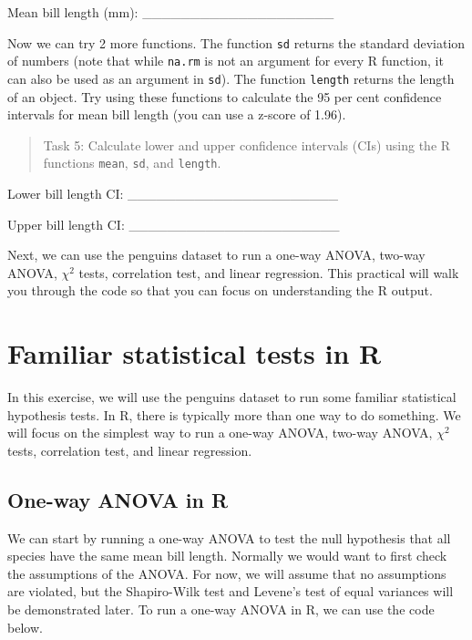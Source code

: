 \documentclass[
]{scrbook}
\begin{document}
Mean bill length (mm): \_\_\_\_\_\_\_\_\_\_\_\_\_\_\_\_\_\_\_\_

Now we can try 2 more functions.
The function \texttt{sd} returns the standard deviation of numbers (note that while \texttt{na.rm} is not an argument for every R function, it can also be used as an argument in \texttt{sd}).
The function \texttt{length} returns the length of an object.
Try using these functions to calculate the 95 per cent confidence intervals for mean bill length (you can use a z-score of 1.96).

\begin{quote}
Task 5: Calculate lower and upper confidence intervals (CIs) using the R functions \texttt{mean}, \texttt{sd}, and \texttt{length}.
\end{quote}

Lower bill length CI: \_\_\_\_\_\_\_\_\_\_\_\_\_\_\_\_\_\_\_\_\_\_

Upper bill length CI: \_\_\_\_\_\_\_\_\_\_\_\_\_\_\_\_\_\_\_\_\_\_

Next, we can use the penguins dataset to run a one-way ANOVA, two-way ANOVA, \(\chi^{2}\) tests, correlation test, and linear regression.
This practical will walk you through the code so that you can focus on understanding the R output.

\hypertarget{familiar-statistical-tests-in-r}{%
\section{Familiar statistical tests in R}\label{familiar-statistical-tests-in-r}}

In this exercise, we will use the penguins dataset to run some familiar statistical hypothesis tests.
In R, there is typically more than one way to do something.
We will focus on the simplest way to run a one-way ANOVA, two-way ANOVA, \(\chi^{2}\) tests, correlation test, and linear regression.

\hypertarget{one-way-anova-in-r}{%
\subsection{One-way ANOVA in R}\label{one-way-anova-in-r}}

We can start by running a one-way ANOVA to test the null hypothesis that all species have the same mean bill length.
Normally we would want to first check the assumptions of the ANOVA.
For now, we will assume that no assumptions are violated, but the Shapiro-Wilk test and Levene's test of equal variances will be demonstrated later.
To run a one-way ANOVA in R, we can use the code below.
\end{document}
